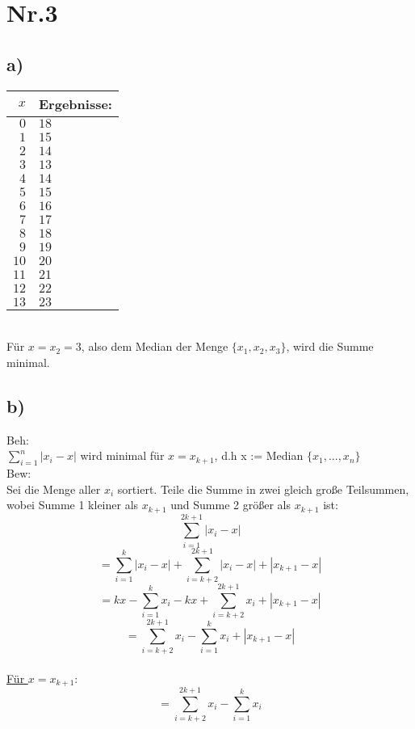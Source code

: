 \documentclass[a4paper,11pt,twoside]{article}
\begin{document}
\pagebreak

\section*{Nr.3}
\subsection*{a)}
\begin{tabular}{r|l}
	$x$ & Ergebnisse: \\ \hline
	$0$&$18$\\
	$1$&$15$\\
	$2$&$14$\\
	$3$&$13$\\
	$4$&$14$\\
	$5$&$15$\\
	$6$&$16$\\
	$7$&$17$\\
	$8$&$18$\\
	$9$&$19$\\
	$10$&$20$\\
	$11$&$21$\\
	$12$&$22$\\
	$13$&$23$
\end{tabular} \\

Für $x=x_2=3$, also dem Median der Menge $\{x_1, x_2, x_3\}$, wird die Summe minimal.


\subsection*{b)}

Beh:\\ $\sum_{i=1}^{n} |x_i-x|$ wird minimal für $x = x_{k+1}$, d.h x := Median $\{x_1, ..., x_n\}$\\

Bew: \\
Sei die Menge aller $x_i$ sortiert. Teile die Summe in zwei gleich große Teilsummen, wobei Summe 1 kleiner als $x_{k+1}$ und Summe 2 größer als $x_{k+1} $ ist:
\[\sum_{i=1}^{2k+1}|x_i-x|\]
\[= \sum_{i=1}^{k}|x_i-x| + \sum_{i=k+2}^{2k+1}|x_i-x| + |x_{k+1}-x|\]
\[= kx - \sum_{i=1}^{k}x_i -kx+ \sum_{i=k+2}^{2k+1}x_i + |x_{k+1}-x|\]
\[= \sum_{i=k+2}^{2k+1}x_i - \sum_{i=1}^{k}x_i + |x_{k+1}-x|\]\\

\underline{Für $x=x_{k+1}$}:
\[= \sum_{i=k+2}^{2k+1}x_i - \sum_{i=1}^{k}x_i \] \\
\end{document}
